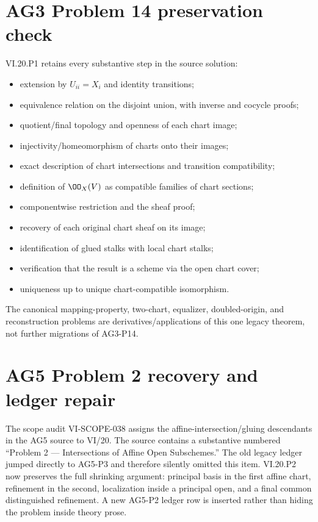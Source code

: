 \section*{AG3 Problem 14 preservation check}
VI.20.P1 retains every substantive step in the source solution:
\begin{itemize}
\item extension by $U_{ii}=X_i$ and identity transitions;
\item equivalence relation on the disjoint union, with inverse and cocycle proofs;
\item quotient/final topology and openness of each chart image;
\item injectivity/homeomorphism of charts onto their images;
\item exact description of chart intersections and transition compatibility;
\item definition of $\OO_X(V)$ as compatible families of chart sections;
\item componentwise restriction and the sheaf proof;
\item recovery of each original chart sheaf on its image;
\item identification of glued stalks with local chart stalks;
\item verification that the result is a scheme via the open chart cover;
\item uniqueness up to unique chart-compatible isomorphism.
\end{itemize}
The canonical mapping-property, two-chart, equalizer, doubled-origin, and reconstruction problems are derivatives/applications of this one legacy theorem, not further migrations of AG3-P14.

\section*{AG5 Problem 2 recovery and ledger repair}
The scope audit VI-SCOPE-038 assigns the affine-intersection/gluing descendants in the AG5 source to VI/20.  The source contains a substantive numbered
``Problem 2 — Intersections of Affine Open Subschemes.''  The old legacy ledger jumped directly to
AG5-P3 and therefore silently omitted this item.  VI.20.P2 now preserves the full shrinking argument:
principal basis in the first affine chart, refinement in the second, localization inside a principal
open, and a final common distinguished refinement.  A new AG5-P2 ledger row is inserted rather than
hiding the problem inside theory prose.

